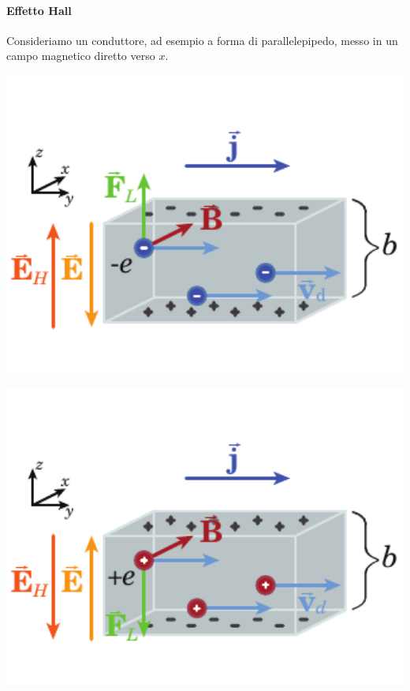 \paragraph{Effetto Hall} %
Consideriamo un conduttore, ad esempio a forma di parallelepipedo, messo in un campo magnetico diretto verso $x$.
\begin{center}
	\begin{minipage}{0.49\textwidth}
		\begin{center}
			\includegraphics[width=1\textwidth]{images/chp7/chp7effettohall1.pdf}
		\end{center}
	\end{minipage}
	\begin{minipage}{0.49\textwidth}
		\begin{center}
			\includegraphics[width=1\textwidth]{images/chp7/chp7effettohall2.pdf}
		\end{center}
	\end{minipage}
\end{center}

